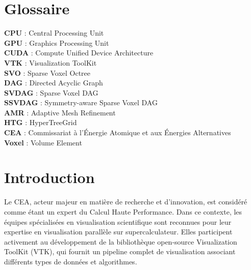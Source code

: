 \documentclass[12pt,a4paper,twoside]{article}
\begin{document}
    \newpage

    \section*{Glossaire}                             %
    \noindent
    \textbf{CPU} : Central Processing Unit \\
    \textbf{GPU} : Graphics Processing Unit \\
    \textbf{CUDA} : Compute Unified Device Architecture \\
    \textbf{VTK} : Visualization ToolKit \\
    \textbf{SVO} : Sparse Voxel Octree \\
    \textbf{DAG} : Directed Acyclic Graph \\
    \textbf{SVDAG} : Sparse Voxel DAG \\
    \textbf{SSVDAG} : Symmetry-aware Sparse Voxel DAG \\
    \textbf{AMR} : Adaptive Mesh Refinement \\
    \textbf{HTG} : HyperTreeGrid \\
    \textbf{CEA} : Commissariat à l'Énergie Atomique et aux Énergies Alternatives\\
    \textbf{Voxel} : Volume Element\\



    \newpage

    \renewcommand{\contentsname}{Sommaire}

    \tableofcontents


    \newpage

    \lstset{numbers=left, tabsize=3, frame=single, numberstyle=\ttfamily,
    basicstyle=\footnotesize}
    \thispagestyle{empty}

    \section{Introduction}                          %



    Le CEA, acteur majeur en matière de recherche et d’innovation, est considéré comme étant un expert du Calcul Haute
    Performance. Dans ce contexte, les équipes spécialisées en visualisation scientifique sont reconnues pour
    leur expertise en visualisation parallèle sur supercalculateur. Elles participent activement au développement de la
    bibliothèque open-source Visualization ToolKit (VTK), qui fournit un pipeline complet de visualisation associant différents types de données
    et algorithmes.
\end{document}
